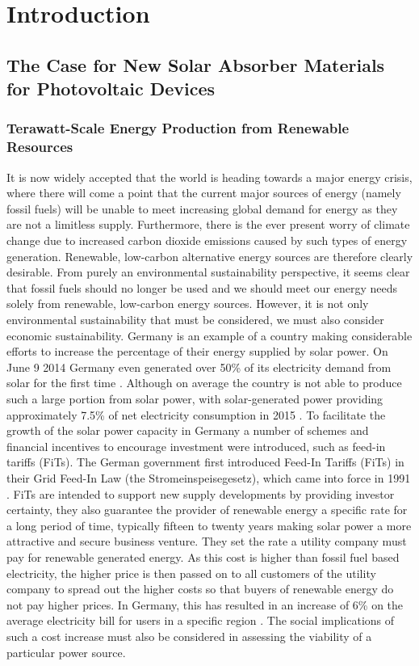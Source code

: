 \chapter{Introduction}

\section{The Case for New Solar Absorber Materials for Photovoltaic Devices}

\subsection{Terawatt-Scale Energy Production from Renewable Resources}

It is now widely accepted that the world is heading towards a major energy crisis, where there will come a point that the current major sources of energy (namely fossil fuels) will be unable to meet increasing global demand for energy as they are not a limitless supply. Furthermore, there is the ever present worry of climate change due to increased carbon dioxide emissions caused by such types of energy generation. Renewable, low-carbon alternative energy sources are therefore clearly desirable. From purely an environmental sustainability perspective, it seems clear that fossil fuels should no longer be used and we should meet our energy needs solely from renewable, low-carbon energy sources. However, it is not only environmental sustainability that must be considered, we must also consider economic sustainability. Germany is an example of a country making considerable efforts to increase the percentage of their energy supplied by solar power. On June 9 2014 Germany even generated over 50\% of its electricity demand from solar for the first time \cite{Germany_guardian_news}. Although on average the country is not able to produce such a large portion from solar power, with solar-generated power providing approximately 7.5\% of net electricity consumption in 2015 \cite{Germany_PV}. To facilitate the growth of the solar power capacity in Germany a number of schemes and financial incentives to encourage investment were introduced, such as feed-in tariffs (FiTs).
The German government first introduced Feed-In Tariffs (FiTs) in their Grid Feed-In Law (the Stromeinspeisegesetz), which came into force in 1991 \cite{Germany_Lang}. FiTs are intended to support new supply developments by providing investor certainty, they also guarantee the provider of renewable energy a specific rate for a long period of time, typically fifteen to twenty years making solar power a more attractive and secure business venture. They set the rate a utility company must pay for renewable generated energy. As this cost is higher than fossil fuel based electricity, the higher price is then passed on to all customers of the utility company to spread out the higher costs so that buyers of renewable energy do not pay higher prices. In Germany, this has resulted in an increase of 6\% on the average electricity bill for users in a specific region \cite{Germany_Oregon}. The social implications of such a cost increase must also be considered in assessing the viability of a particular power source.

